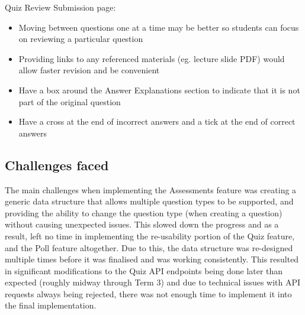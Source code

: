 Quiz Review Submission page:
\begin{itemize}
	\item Moving between questions one at a time may be better so students can focus on reviewing a particular question
	\item Providing links to any referenced materials (eg. lecture slide PDF) would allow faster revision and be convenient
	\item Have a box around the Answer Explanations section to indicate that it is not part of the original question
	\item Have a cross at the end of incorrect answers and a tick at the end of correct answers
\end{itemize}

\subsection{Challenges faced}
The main challenges when implementing the Assessments feature was creating a generic data structure that allows multiple question types to be supported, and providing the ability to change the question type (when creating a question) without causing unexpected issues. This slowed down the progress and as a result, left no time in implementing the re-usability portion of the Quiz feature, and the Poll feature altogether. Due to this, the data structure was re-designed multiple times before it was finalised and was working consistently. This resulted in significant modifications to the Quiz API endpoints being done later than expected (roughly midway through Term 3) and due to technical issues with API requests always being rejected, there was not enough time to implement it into the final implementation.